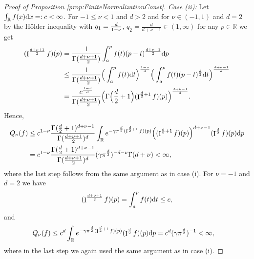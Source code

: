 \documentclass[11pt,a4paper]{article}
\theoremstyle{plain}
\theoremstyle{definition}
\theoremstyle{remark}
\def\RR{\mathbb{R}}
\newcommand{\dd}{{\rm d}}
\newcommand{\frI}{\mathop{\mathrm{I}}\nolimits}
\begin{document}
\begin{proof}[Proof of Proposition \ref{prop:FiniteNormalizationConst}]
    \textit{Case (ii):}
    Let $\int_{\RR} f(x) \dd x =: c < \infty$. For $-1\leq \nu <1$ and $d>2$ and for $\nu\in(-1,1)$ and $d=2$ by the Hölder inequality with $q_1={d\over 1-\nu}$, $q_2=\frac{d}{d+\nu-1}\in (1,\infty)$ for any $p\in\RR$ we get
    \begin{align*}
        (\frI^{d+\nu+1\over 2}f)(p)&={1\over \Gamma({d+\nu+1\over 2})}\int_{a}^{p}f(t)(p-t)^\frac{d+\nu-1}{2} \dd p \\
        &\le {1\over \Gamma({d+\nu+1\over 2})}\Big(\int_{a}^{p}f(t)\dd t\Big)^{1-\nu\over d}\Big(\int_{a}^p f(t) (p-t)^{\frac{d}{2}} \dd t\Big)^{d+\nu-1\over d} \\
        &= {c^{1-\nu\over d}\over \Gamma({d+\nu+1\over 2})} \Big(\Gamma\Big(\frac{d}{2}+1\Big)(\frI^{\frac{d}{2}+1} f)(p)\Big)^{d+\nu-1\over d}.
    \end{align*}
    Hence,
    \begin{align*}
        Q_{\nu}(f)&\leq c^{1-\nu}{\Gamma(\frac{d}{2}+1)^{d+\nu-1}\over \Gamma({d+\nu+1\over 2})^d}\int_{\RR}e^{-\gamma\pi^{\frac{d}{2}}(\frI^{\frac{d}{2}+1}f)(p)} \Big((\frI^{{d\over 2}+1}f)(p)\Big)^{d+\nu-1}(\frI^{{d\over 2}}f)(p) \dd p\\
    &= c^{1-\nu}{\Gamma(\frac{d}{2}+1)^{d+\nu-1}\over \Gamma({d+\nu+1\over 2})^d}(\gamma\pi^{d\over 2})^{-d-\nu}\Gamma(d+\nu)< \infty,
    \end{align*}
    where the last step follows from the same argument as in case (i). For $\nu=-1$ and $d=2$ we have 
    $$
        (\frI^{d+\nu+1\over 2}f)(p)=\int_{a}^p f(t)\dd t\leq c,
    $$
    and 
    \begin{align*}
        Q_{\nu}(f)&\leq c^d\int_{\RR}e^{-\gamma\pi^{\frac{d}{2}}(\frI^{\frac{d}{2}+1}f)(p)}(\frI^{{d\over 2}}f)(p) \dd p= c^{d}(\gamma\pi^{d\over 2})^{-1}< \infty,
    \end{align*}
    where in the last step we again used the same argument as in case (i).


\end{proof}
\end{document}
